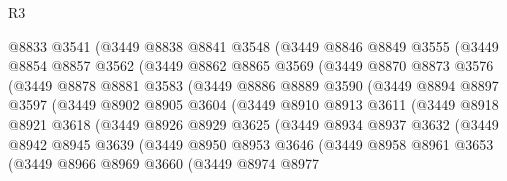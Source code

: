 \begin{lexlean}{R3}
\begin{coremodule}
            @8833
            @3541
            (@3449
              @8838
              @8841
              @3548
              (@3449
                @8846
                @8849
                @3555
                (@3449
                  @8854
                  @8857
                  @3562
                  (@3449
                    @8862
                    @8865
                    @3569
                    (@3449
                      @8870
                      @8873
                      @3576
                      (@3449
                        @8878
                        @8881
                        @3583
                        (@3449
                          @8886
                          @8889
                          @3590
                          (@3449
                            @8894
                            @8897
                            @3597
                            (@3449
                              @8902
                              @8905
                              @3604
                              (@3449
                                @8910
                                @8913
                                @3611
                                (@3449
                                  @8918
                                  @8921
                                  @3618
                                  (@3449
                                    @8926
                                    @8929
                                    @3625
                                    (@3449
                                      @8934
                                      @8937
                                      @3632
                                      (@3449
                                        @8942
                                        @8945
                                        @3639
                                        (@3449
                                          @8950
                                          @8953
                                          @3646
                                          (@3449
                                            @8958
                                            @8961
                                            @3653
                                            (@3449
                                              @8966
                                              @8969
                                              @3660
                                              (@3449
                                                @8974
                                                @8977

\end{coremodule}
\end{lexlean}
